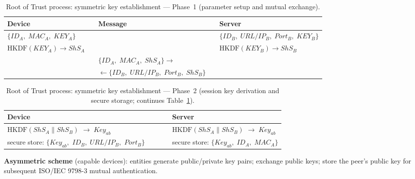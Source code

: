 \documentclass[12pt,a4paper]{article}
\begin{document}
\begin{table}[htbp]
  \centering
  \caption{Root of Trust process: symmetric key establishment --- Phase~1 (parameter setup and mutual exchange).}
  \label{tab:rotpsim}
  \small
  \begin{tabular}{
      >{\centering\arraybackslash}p{4.2cm}
      c
      >{\centering\arraybackslash}p{4.8cm}
      c
      >{\centering\arraybackslash}p{4.2cm}
  }
    \toprule
    \textbf{Device} & & \textbf{Message} & & \textbf{Server} \\
    \midrule
    $\{ID_{A},\;MAC_A,\;KEY_A\}$ & & & & $\{ID_B,\;URL/IP_B,\;Port_B,\;KEY_B\}$ \\
    $\text{HKDF}(KEY_A) \rightarrow ShS_A$ & & & & $\text{HKDF}(KEY_B) \rightarrow ShS_B$ \\
    & & $\{ID_A,\;MAC_A,\;ShS_A\} \rightarrow$ & & \\
    & & $\leftarrow \{ID_B,\;URL/IP_B,\;Port_B,\;ShS_B\}$ & & \\
    \bottomrule
  \end{tabular}
\end{table}

\begin{table}[htbp]
  \centering
  \caption{Root of Trust process: symmetric key establishment --- Phase~2 (session key derivation and secure storage; continues Table~\ref{tab:rotpsim}).}
  \label{tab:rotpsim_b}
  \small
  \begin{tabular}{
      >{\centering\arraybackslash}p{3.8cm}
      c
      >{\centering\arraybackslash}p{4.0cm}
      c
      >{\centering\arraybackslash}p{3.8cm}
  }
    \toprule
    \textbf{Device} & & & & \textbf{Server} \\
    \midrule
    $\text{HKDF}(ShS_A \!\parallel\! ShS_B)$ ${\rightarrow\;Key_{ab}}$ & & & & $\text{HKDF}(ShS_A \!\parallel\! ShS_B)$ ${\rightarrow\;Key_{ab}}$ \\
    secure store: $\{Key_{ab},$ $ID_B,\;URL/IP_B,$ $Port_B\}$ & & & & secure store: $\{Key_{ab},\;ID_A,\;MAC_A\}$ \\
    \bottomrule
  \end{tabular}
\end{table}

\textbf{Asymmetric scheme} (capable devices): entities generate public/private key pairs; exchange public keys; store the peer's public key for subsequent ISO/IEC 9798-3 mutual authentication.
\end{document}
